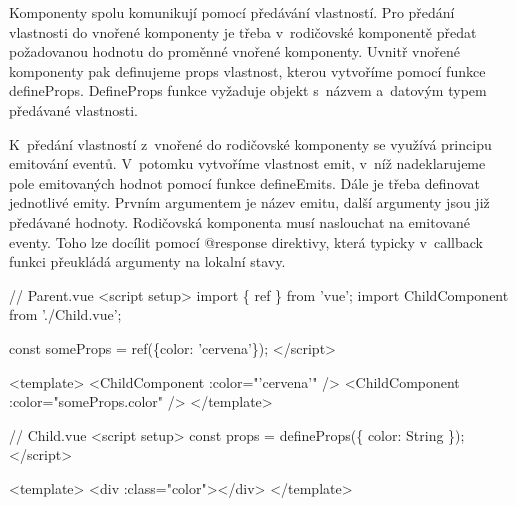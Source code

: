 Komponenty spolu komunikují pomocí předávání vlastností. 
Pro předání vlastnosti do vnořené komponenty je třeba v~rodičovské komponentě předat požadovanou hodnotu do proměnné vnořené komponenty. 
Uvnitř vnořené komponenty pak definujeme props vlastnost, kterou vytvoříme pomocí funkce defineProps. 
DefineProps funkce vyžaduje objekt s~názvem a~datovým typem předávané vlastnosti.

K~předání vlastností z~vnořené do rodičovské komponenty se využívá principu emitování eventů. 
V~potomku vytvoříme vlastnost emit, v~níž nadeklarujeme pole emitovaných hodnot pomocí funkce defineEmits. Dále je třeba definovat jednotlivé emity. 
Prvním argumentem je název emitu, další argumenty jsou již předávané hodnoty. Rodičovská komponenta musí naslouchat na emitované eventy. 
Toho lze docílit pomocí @response direktivy, která typicky v~callback funkci přeukládá argumenty na lokalní stavy.\cite{vuemacrae,vue}







  


\begin{prog}
// Parent.vue
<script setup>
  import \{ ref \} from 'vue';
  import ChildComponent from './Child.vue';

  const someProps = ref(\{color: 'cervena'\});
</script>

<template>
	<ChildComponent :color="'cervena'" />
  <ChildComponent :color="someProps.color" />
</template>

// Child.vue
<script setup>
  const props = defineProps(\{
    color: String
  \});
</script>

<template>
  <div :class="color"></div>
</template>
\end{prog}

